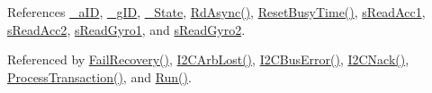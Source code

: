 References \hyperlink{_i_m_u_8h_source_l00094}{\_\-aID}, \hyperlink{_i_m_u_8h_source_l00093}{\_\-gID}, \hyperlink{_i_m_u_8h_source_l00085}{\_\-State}, \hyperlink{_i_m_u_8cpp_source_l00786}{RdAsync()}, \hyperlink{_i_m_u_8h_source_l00190}{ResetBusyTime()}, \hyperlink{_i_m_u_8h_source_l00048}{sReadAcc1}, \hyperlink{_i_m_u_8h_source_l00050}{sReadAcc2}, \hyperlink{_i_m_u_8h_source_l00047}{sReadGyro1}, and \hyperlink{_i_m_u_8h_source_l00049}{sReadGyro2}.



Referenced by \hyperlink{_i_m_u_8cpp_source_l00398}{FailRecovery()}, \hyperlink{_i_m_u_8cpp_source_l00534}{I2CArbLost()}, \hyperlink{_i_m_u_8cpp_source_l00499}{I2CBusError()}, \hyperlink{_i_m_u_8cpp_source_l00463}{I2CNack()}, \hyperlink{_i_m_u_8cpp_source_l00348}{ProcessTransaction()}, and \hyperlink{_i_m_u_8cpp_source_l00290}{Run()}.


